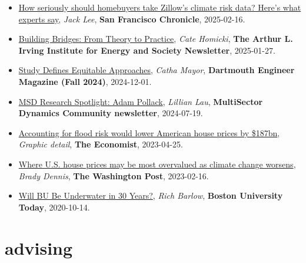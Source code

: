 \documentclass[10pt,oneside]{article}
\begin{document}
\begin{itemize}[label={}]
  
  \item \href{https://www.sfchronicle.com/science/article/zillow-home-climate-risk-20147318.php}{How seriously should homebuyers take Zillow’s climate risk data? Here’s what experts say}, \textit{Jack Lee}, \textbf{San Francisco Chronicle}, 2025-02-16.
        
  \item \href{https://irving.dartmouth.edu/news/2025/01/building-bridges-theory-practice}{Building Bridges: From Theory to Practice}, \textit{Cate Homicki}, \textbf{The Arthur L. Irving Institute for Energy and Society Newsletter}, 2025-01-27.
        
  \item \href{https://cdn2.assets-servd.host/thayer-web/production/images/Dartmouth-Engineer-Magazine-Fall-2024.pdf?dm=1728076598}{Study Defines Equitable Approaches}, \textit{Catha Mayor}, \textbf{Dartmouth Engineer Magazine (Fall 2024)}, 2024-12-01.
        
  \item \href{https://eesm.science.energy.gov/news/msd-research-spotlight-adam-pollack}{MSD Research Spotlight: Adam Pollack}, \textit{Lillian Lau}, \textbf{MultiSector Dynamics Community newsletter}, 2024-07-19.
        
  \item \href{https://www.economist.com/graphic-detail/2023/04/25/accounting-for-flood-risk-would-lower-american-house-prices-by-187bn}{Accounting for flood risk would lower American house prices by \$187bn}, \textit{Graphic detail}, \textbf{The Economist}, 2023-04-25.
        
  \item \href{https://www.washingtonpost.com/climate-environment/2023/02/16/flood-risk-housing-market-property-value/}{Where U.S. house prices may be most overvalued as climate change worsens}, \textit{Brady Dennis}, \textbf{The Washington Post}, 2023-02-16.
        
  \item \href{https://www.bu.edu/articles/2020/will-bu-be-underwater-in-30-years-climate-change/}{Will BU Be Underwater in 30 Years?}, \textit{Rich Barlow}, \textbf{Boston University Today}, 2020-10-14.
        
\end{itemize}


\section{advising}
\end{document}
